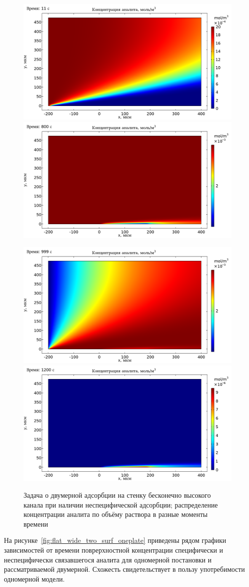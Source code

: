 \documentclass[oneside,final,12pt]{extreport}
\begin{document}
\begin{figure}
  \centering
  \includegraphics[width=.5\textwidth]{pic/flat_wide_twosurf_11s}%
  \includegraphics[width=.5\textwidth]{pic/flat_wide_twosurf_800s}

  \includegraphics[width=.5\textwidth]{pic/flat_wide_twosurf_999s}%
  \includegraphics[width=.5\textwidth]{pic/flat_wide_twosurf_1200s}

  \caption{%
    \label{fif:flat_wide_two_surf_concdistribs}%
    Задача о двумерной адсорбции на стенку бесконечно высокого канала
    при наличии неспецифической адсорбции;
    распределение концентрации аналита по объёму раствора в разные моменты времени
  }

\end{figure}

На рисунке~\ref{fig:flat_wide_two_surf_oneplate}
приведены рядом графики зависимостей от времени
поврерхностной концентрации специфически и неспецифически связавшегося аналита
для одномерной постановки и рассматриваемой двумерной.
Схожесть свидетельствует в пользу употребимости одномерной модели.
\end{document}
